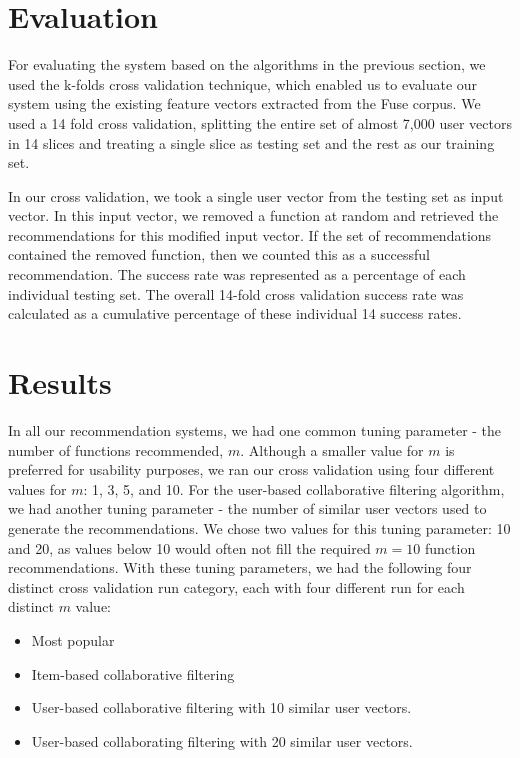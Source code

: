 \documentclass{article} %
\begin{document}
\section{Evaluation}
For evaluating the system based on the algorithms in the previous section, we used the k-folds cross validation technique, which enabled us to evaluate our system using the existing feature vectors extracted from the Fuse corpus. We used a 14 fold cross validation, splitting the entire set of almost 7,000 user vectors in 14 slices and treating a single slice as testing set and the rest as our training set.

In our cross validation, we took a single user vector from the testing set as input vector. In this input vector, we removed a function at random and retrieved the recommendations for this modified input vector. If the set of recommendations contained the removed function, then we counted this as a successful recommendation. The success rate was represented as a percentage of each individual testing set. The overall 14-fold cross validation success rate was calculated as a cumulative percentage of these individual 14 success rates.

\section{Results}
In all our recommendation systems, we had one common tuning parameter - the number of functions recommended, $m$. Although a smaller value for $m$ is preferred for usability purposes, we ran our cross validation using four different values for $m$: 1, 3, 5, and 10. For the user-based collaborative filtering algorithm, we had another tuning parameter - the number of similar user vectors used to generate the recommendations. We chose two values for this tuning parameter: 10 and 20, as values below 10 would often not fill the required $m=10$ function recommendations. With these tuning parameters, we had the following four distinct cross validation run category, each with four different run for each distinct $m$ value:
\begin{itemize}
   \item Most popular
   \item Item-based collaborative filtering
   \item User-based collaborative filtering with 10 similar user vectors.
   \item User-based collaborating filtering with 20 similar user vectors.
\end{itemize}
\end{document}

